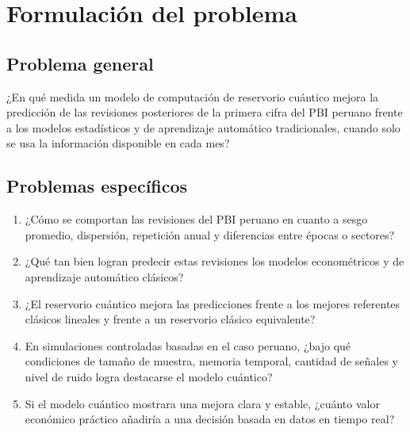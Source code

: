 \section{Formulación del problema}

\subsection{Problema general}

¿En qué medida un modelo de computación de reservorio cuántico mejora la predicción de las revisiones posteriores de la primera cifra del PBI peruano frente a los modelos estadísticos y de aprendizaje automático tradicionales, cuando solo se usa la información disponible en cada mes?

\subsection{Problemas específicos}

\begin{enumerate}
	\item ¿Cómo se comportan las revisiones del PBI peruano en cuanto a sesgo promedio, dispersión, repetición anual y diferencias entre épocas o sectores?
	\item ¿Qué tan bien logran predecir estas revisiones los modelos econométricos y de aprendizaje automático clásicos?
	\item ¿El reservorio cuántico mejora las predicciones frente a los mejores referentes clásicos lineales y frente a un reservorio clásico equivalente?
	\item En simulaciones controladas basadas en el caso peruano, ¿bajo qué condiciones de tamaño de muestra, memoria temporal, cantidad de señales y nivel de ruido logra destacarse el modelo cuántico?
	\item Si el modelo cuántico mostrara una mejora clara y estable, ¿cuánto valor económico práctico añadiría a una decisión basada en datos en tiempo real?
\end{enumerate}
